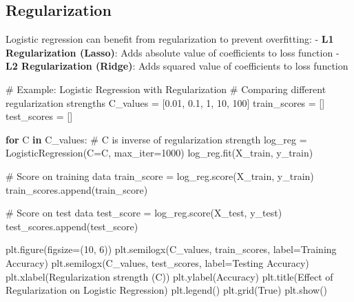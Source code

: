 \documentclass[
  letterpaper,
  DIV=11,
  numbers=noendperiod]{scrreprt}
\newenvironment{Shaded}{\begin{snugshade}}{\end{snugshade}}
\newcommand{\CommentTok}[1]{\textcolor[rgb]{0.37,0.37,0.37}{#1}}
\newcommand{\ControlFlowTok}[1]{\textcolor[rgb]{0.00,0.23,0.31}{\textbf{#1}}}
\newcommand{\DecValTok}[1]{\textcolor[rgb]{0.68,0.00,0.00}{#1}}
\newcommand{\FloatTok}[1]{\textcolor[rgb]{0.68,0.00,0.00}{#1}}
\newcommand{\KeywordTok}[1]{\textcolor[rgb]{0.00,0.23,0.31}{\textbf{#1}}}
\newcommand{\NormalTok}[1]{\textcolor[rgb]{0.00,0.23,0.31}{#1}}
\newcommand{\OperatorTok}[1]{\textcolor[rgb]{0.37,0.37,0.37}{#1}}
\newcommand{\StringTok}[1]{\textcolor[rgb]{0.13,0.47,0.30}{#1}}
\newcommand{\VariableTok}[1]{\textcolor[rgb]{0.07,0.07,0.07}{#1}}
\begin{document}
\subsection{Regularization}\label{regularization}

Logistic regression can benefit from regularization to prevent
overfitting: - \textbf{L1 Regularization (Lasso)}: Adds absolute value
of coefficients to loss function - \textbf{L2 Regularization (Ridge)}:
Adds squared value of coefficients to loss function

\begin{Shaded}
\begin{Highlighting}[]
\CommentTok{\# Example: Logistic Regression with Regularization}
\CommentTok{\# Comparing different regularization strengths}
\NormalTok{C\_values }\OperatorTok{=}\NormalTok{ [}\FloatTok{0.01}\NormalTok{, }\FloatTok{0.1}\NormalTok{, }\DecValTok{1}\NormalTok{, }\DecValTok{10}\NormalTok{, }\DecValTok{100}\NormalTok{]}
\NormalTok{train\_scores }\OperatorTok{=}\NormalTok{ []}
\NormalTok{test\_scores }\OperatorTok{=}\NormalTok{ []}

\ControlFlowTok{for}\NormalTok{ C }\KeywordTok{in}\NormalTok{ C\_values:}
    \CommentTok{\# C is inverse of regularization strength}
\NormalTok{    log\_reg }\OperatorTok{=}\NormalTok{ LogisticRegression(C}\OperatorTok{=}\NormalTok{C, max\_iter}\OperatorTok{=}\DecValTok{1000}\NormalTok{)}
\NormalTok{    log\_reg.fit(X\_train, y\_train)}
    
    \CommentTok{\# Score on training data}
\NormalTok{    train\_score }\OperatorTok{=}\NormalTok{ log\_reg.score(X\_train, y\_train)}
\NormalTok{    train\_scores.append(train\_score)}
    
    \CommentTok{\# Score on test data}
\NormalTok{    test\_score }\OperatorTok{=}\NormalTok{ log\_reg.score(X\_test, y\_test)}
\NormalTok{    test\_scores.append(test\_score)}

\NormalTok{plt.figure(figsize}\OperatorTok{=}\NormalTok{(}\DecValTok{10}\NormalTok{, }\DecValTok{6}\NormalTok{))}
\NormalTok{plt.semilogx(C\_values, train\_scores, label}\OperatorTok{=}\StringTok{\textquotesingle{}Training Accuracy\textquotesingle{}}\NormalTok{)}
\NormalTok{plt.semilogx(C\_values, test\_scores, label}\OperatorTok{=}\StringTok{\textquotesingle{}Testing Accuracy\textquotesingle{}}\NormalTok{)}
\NormalTok{plt.xlabel(}\StringTok{\textquotesingle{}Regularization strength (C)\textquotesingle{}}\NormalTok{)}
\NormalTok{plt.ylabel(}\StringTok{\textquotesingle{}Accuracy\textquotesingle{}}\NormalTok{)}
\NormalTok{plt.title(}\StringTok{\textquotesingle{}Effect of Regularization on Logistic Regression\textquotesingle{}}\NormalTok{)}
\NormalTok{plt.legend()}
\NormalTok{plt.grid(}\VariableTok{True}\NormalTok{)}
\NormalTok{plt.show()}
\end{Highlighting}
\end{Shaded}
\end{document}
